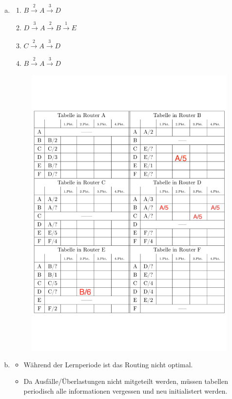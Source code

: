

\begin{enumerate}[a)]
\item 
	\begin{enumerate}[1)]
		\item $B \overset{2}{\to} A \overset{3}{\to} D$
		\item $D \overset{3}{\to} A \overset{2}{\to} B  \overset{1}{\to} E$
		\item $C \overset{2}{\to} A \overset{3}{\to} D$
		\item $B \overset{2}{\to} A \overset{3}{\to} D$
	\end{enumerate}

	\begin{figure}[H]
		\centering
		\includegraphics[trim = 0cm 4cm 0cm 4cm,width=13cm]{table.pdf}
	\end{figure}

\item \begin{itemize}


		\item Während der Lernperiode ist das Routing nicht optimal.
		\item Da Ausfälle/Überlastungen nicht mitgeteilt werden, müssen tabellen periodisch alle informationen vergessen und neu initialistert werden.	
	
	\end{itemize}

\end{enumerate}

